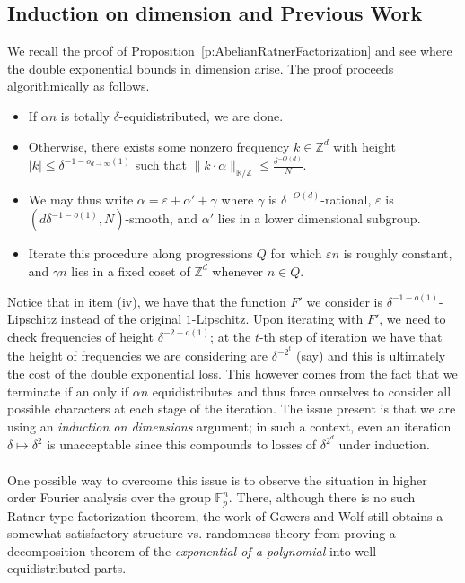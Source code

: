 \documentclass[11pt, a4paper]{amsart}
\theoremstyle{plain}
\theoremstyle{plain}
\theoremstyle{definition}
\theoremstyle{remark}
\numberwithin{equation}{section}
\numberwithin{lemma}{section}
\numberwithin{proposition}{section}
\numberwithin{corollary}{section}
\numberwithin{definition}{section}
\numberwithin{claim}{section}
\begin{document}
\subsection{Induction on dimension and Previous Work}
We recall the proof of Proposition~\ref{p:AbelianRatnerFactorization} and see where the double exponential bounds in dimension arise. The proof proceeds algorithmically as follows.
\begin{itemize}
    \item[(i)] If $\alpha n$ is totally $\delta$-equidistributed, we are done.
    \item[(ii)] Otherwise, there exists some nonzero frequency $k \in \mathbb{Z}^d$ with height $|k| \le \delta^{-1 - o_{d \to \infty}(1)}$ such that $\|k \cdot \alpha\|_{\mathbb{R}/\mathbb{Z}} \le \frac{\delta^{-O(d)}}{N}$. 
    \item[(iii)] We may thus write $\alpha = \varepsilon + \alpha' + \gamma$ where $\gamma$ is $\delta^{-O(d)}$-rational, $\varepsilon$ is $(d\delta^{-1 - o(1)}, N)$-smooth, and $\alpha'$ lies in a lower dimensional subgroup.
    \item[(iv)] Iterate this procedure along progressions $Q$ for which $\varepsilon n$ is roughly constant, and $\gamma n$ lies in a fixed coset of $\mathbb{Z}^d$ whenever $n \in Q$.
\end{itemize}
Notice that in item (iv), we have that the function $F'$ we consider is $\delta^{-1-o(1)}$-Lipschitz instead of the original $1$-Lipschitz. Upon iterating with $F'$, we need to check frequencies of height $\delta^{-2-o(1)}$; at the $t$-th step of iteration we have that the height of frequencies we are considering are $\delta^{-2^{t}}$ (say) and this is ultimately the cost of the double exponential loss. This however comes from the fact that we terminate if an only if $\alpha n$ equidistributes and thus force ourselves to consider all possible characters at each stage of the iteration. The issue present is that we are using an \emph{induction on dimensions} argument; in such a context, even an iteration $\delta \mapsto \delta^2$ is unacceptable since this compounds to losses of $\delta^{2^d}$ under induction. \\\\
One possible way to overcome this issue is to observe the situation in higher order Fourier analysis over the group $\mathbb{F}_p^n$. There, although there is no such Ratner-type factorization theorem, the work of Gowers and Wolf \cite{GW11b} still obtains a somewhat satisfactory structure vs. randomness theory from proving a decomposition theorem of the \emph{exponential of a polynomial} into well-equidistributed parts. \\\\
\end{document}
